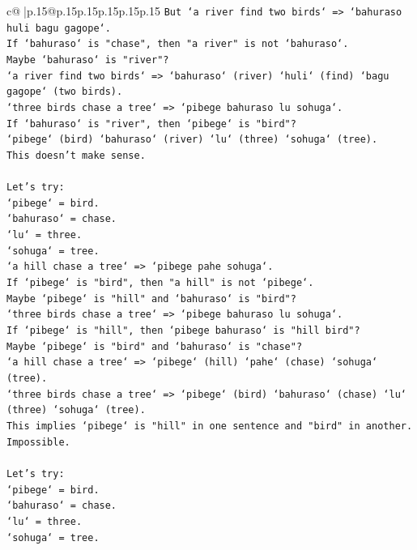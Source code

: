 \documentclass{article}
\begin{document}
{\begin{supertabular}{c@{$\;$}|p{.15\linewidth}@{}p{.15\linewidth}p{.15\linewidth}p{.15\linewidth}p{.15\linewidth}p{.15\linewidth}}
{{{\texttt{But `a river find two birds` => `bahuraso huli bagu gagope`.} \\
\texttt{If `bahuraso` is "chase", then "a river" is not `bahuraso`.} \\
\texttt{Maybe `bahuraso` is "river"?} \\
\texttt{`a river find two birds` => `bahuraso` (river) `huli` (find) `bagu gagope` (two birds).} \\
\texttt{`three birds chase a tree` => `pibege bahuraso lu sohuga`.} \\
\texttt{If `bahuraso` is "river", then `pibege` is "bird"?} \\
\texttt{`pibege` (bird) `bahuraso` (river) `lu` (three) `sohuga` (tree).} \\
\texttt{This doesn't make sense.} \\
\\ 
\texttt{Let's try:} \\
\texttt{`pibege` = bird.} \\
\texttt{`bahuraso` = chase.} \\
\texttt{`lu` = three.} \\
\texttt{`sohuga` = tree.} \\
\texttt{`a hill chase a tree` => `pibege pahe sohuga`.} \\
\texttt{If `pibege` is "bird", then "a hill" is not `pibege`.} \\
\texttt{Maybe `pibege` is "hill" and `bahuraso` is "bird"?} \\
\texttt{`three birds chase a tree` => `pibege bahuraso lu sohuga`.} \\
\texttt{If `pibege` is "hill", then `pibege bahuraso` is "hill bird"?} \\
\texttt{Maybe `pibege` is "bird" and `bahuraso` is "chase"?} \\
\texttt{`a hill chase a tree` => `pibege` (hill) `pahe` (chase) `sohuga` (tree).} \\
\texttt{`three birds chase a tree` => `pibege` (bird) `bahuraso` (chase) `lu` (three) `sohuga` (tree).} \\
\texttt{This implies `pibege` is "hill" in one sentence and "bird" in another. Impossible.} \\
\\ 
\texttt{Let's try:} \\
\texttt{`pibege` = bird.} \\
\texttt{`bahuraso` = chase.} \\
\texttt{`lu` = three.} \\
\texttt{`sohuga` = tree.} \\
}}}
\end{supertabular}}
\end{document}
